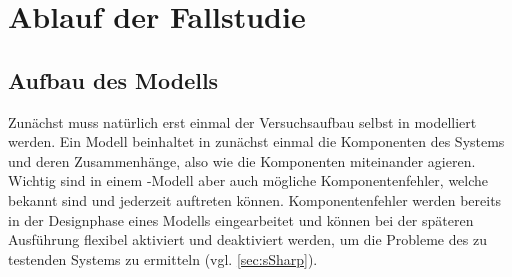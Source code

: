 \section{Ablauf der Fallstudie}\label{sec:ablauf}



\subsection{Aufbau des Modells}\label{sec:modellaufbau}

Zunächst muss natürlich erst einmal der Versuchsaufbau selbst in \sS modelliert werden. Ein Modell beinhaltet in \sS zunächst einmal die Komponenten des Systems und deren Zusammenhänge, also wie die Komponenten miteinander agieren. Wichtig sind in einem \sS-Modell aber auch mögliche Komponentenfehler, welche bekannt sind und jederzeit auftreten können. Komponentenfehler werden bereits in der Designphase eines Modells eingearbeitet und können bei der späteren Ausführung flexibel aktiviert und deaktiviert werden, um die Probleme des zu testenden Systems zu ermitteln (vgl. \autoref{sec:sSharp}).

